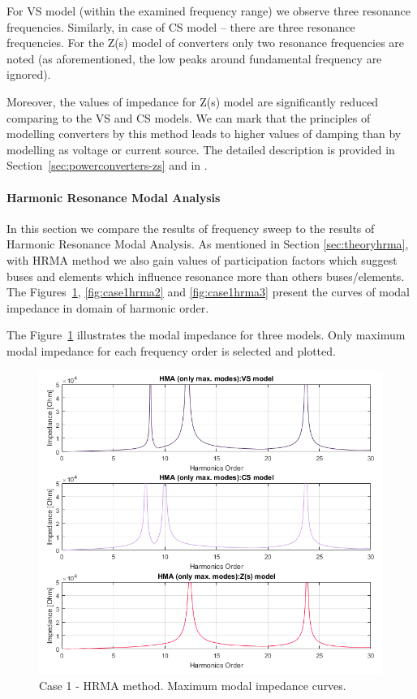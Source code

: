 \documentclass[12pt]{report} %
\begin{document}
For VS model (within the examined frequency range) we observe three resonance frequencies. Similarly, in case of CS model – there are three resonance frequencies. For the Z(s) model of converters only two resonance frequencies are noted (as aforementioned, the low peaks around fundamental frequency are ignored).

Moreover, the values of impedance for Z(s) model are significantly reduced comparing to the VS and CS models. We can mark that the principles of modelling converters by this method leads to higher values of damping than by modelling as voltage or current source. The detailed description is provided in Section~\ref{sec:powerconverters-zs} and in \cite{liusun2013, liusun2014}.

\paragraph{Harmonic Resonance Modal Analysis}
In this section we compare the results of frequency sweep to the results of Harmonic Resonance Modal Analysis. As mentioned in Section \ref{sec:theoryhrma}, with HRMA method we also gain values of participation factors which suggest buses and elements which influence resonance more than others buses/elements. The Figures~\ref{fig:case1hrma1}, \ref{fig:case1hrma2} and \ref{fig:case1hrma3} present the curves of modal impedance in domain of harmonic order.

The Figure~\ref{fig:case1hrma1} illustrates the modal impedance for three models. Only maximum modal impedance for each frequency order is selected and plotted.

\begin{figure}[htb]
	\centering
	\includegraphics[width=1\textwidth]{img/Case1/Case1_HMA_max.png}
  	\caption{Case 1 - HRMA method. Maximum modal impedance curves.}
  	\label{fig:case1hrma1}
\end{figure}
\FloatBarrier
\end{document}
